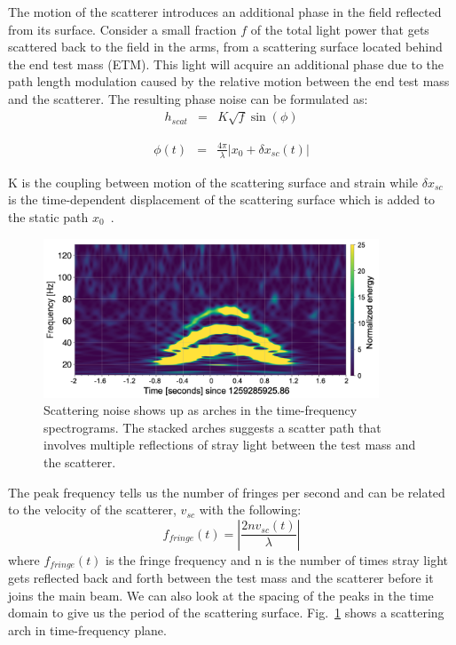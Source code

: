 \documentclass[12pt]{iopart}
\begin{document}
The motion of the scatterer introduces an additional phase in the field reflected from its surface. Consider a small fraction $f$ of the total light power that gets scattered back to the field in the arms, from a scattering surface located behind the end test mass (ETM). This light will acquire an additional phase due to the path length modulation caused by the relative motion between the end test mass and the scatterer. The resulting phase noise can be formulated as:
\begin{eqnarray}
      h_{scat} & = & K\sqrt{f}\sin({\phi}) \label{eq:1}
\end{eqnarray}

\begin{eqnarray}
    {\phi}(t) & = & \frac{4{\pi}}{{\lambda}}\left|{ x_{0} + {\delta} x_{sc}(t)}\right| \label{eq:2}
\end{eqnarray}
    
K is the coupling between motion of the scattering surface and strain while $\delta x_{sc}$ is the time-dependent displacement of the scattering surface which is added to the static path $x_{0}$~\cite{scatvirgo}. 
\par

\begin{figure}[h]
    \centering
    \includegraphics[width=10cm]{scatindarmlrs1.png}
    \caption{Scattering noise shows up as arches in the time-frequency spectrograms. The stacked arches suggests a scatter path that involves multiple reflections of stray light between the test mass and the scatterer.}
    \label{fig:scat}
\end{figure}

The peak frequency tells us the number of fringes per second and can be related to the velocity of the scatterer, $v_{sc}$ with the following:
\begin{equation}
    f_{fringe}(t) = \left|\frac{2nv_{sc}(t)}{\lambda}\right|  \label{eq:3}
\end{equation}
where $f_{fringe}(t)$ is the fringe frequency and n is the number of times stray light gets reflected back and forth between the test mass and the scatterer before it joins the main beam. We can also look at the spacing of the peaks in the time domain to give us the period of the scattering surface. Fig.~\ref{fig:scat} shows a scattering arch in time-frequency plane.
\end{document}
